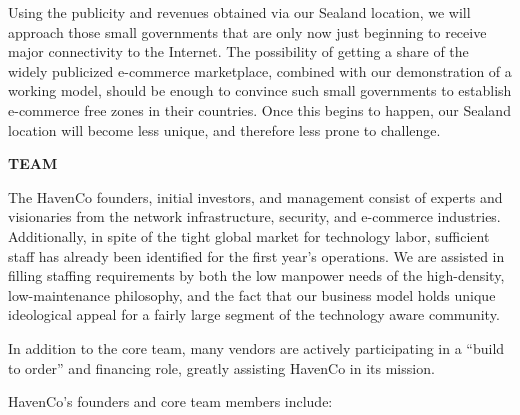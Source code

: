 Using the publicity and revenues obtained via our Sealand location, we will approach those small governments that are only now just beginning to receive major connectivity to the Internet. The possibility of getting a share of the widely publicized e-commerce marketplace, combined with our demonstration of a working model, should be enough to convince such small governments to establish e-commerce free zones in their countries. Once this begins to happen, our Sealand location will become less unique, and therefore less prone to challenge.

\textbf{TEAM}
    
The HavenCo founders, initial investors, and management consist of experts and visionaries from the network infrastructure, security, and e-commerce industries. Additionally, in spite of the tight global market for technology labor, sufficient staff has already been identified for the first year's operations. We are assisted in filling staffing requirements by both the low manpower needs of the high-density, low-maintenance philosophy, and the fact that our business model holds unique ideological appeal for a fairly large segment of the technology aware community.

In addition to the core team, many vendors are actively participating in a ``build to order'' and financing role, greatly assisting HavenCo in its mission.

HavenCo's founders and core team members include:


